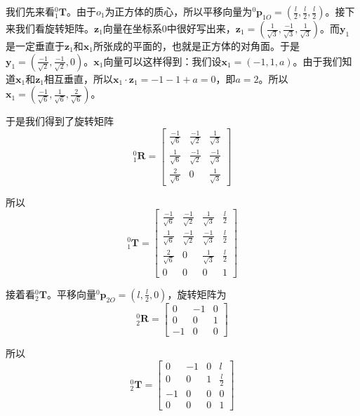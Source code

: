 \documentclass{homework}
\begin{document}
\question 

\begin{sol}

  我们先来看$ _1^0\mathbf{T} $。由于$ o_1 $为正方体的质心，所以平移向量为$ ^0\mathbf{p}_{1O} = (\frac{l}{2}, \frac{l}{2}, \frac{l}{2}) $。接下来我们看旋转矩阵。$ \mathbf{z}_1 $向量在坐标系0中很好写出来，$ \mathbf{z}_1 = (\frac{1}{\sqrt{3}}, \frac{-1}{\sqrt{3}}, \frac{1}{\sqrt{3}}) $。而$ \mathbf{y}_1 $是一定垂直于$ \mathbf{z}_1 $和$ \mathbf{x}_1 $所张成的平面的，也就是正方体的对角面。于是$ \mathbf{y}_1 = (\frac{-1}{\sqrt{2}}, \frac{-1}{\sqrt{2}}, 0) $。$ \mathbf{x}_1 $向量可以这样得到：我们设$ \mathbf{x}_1 = (-1, 1, a) $。由于我们知道$ \mathbf{x}_1 $和$ \mathbf{z}_1 $相互垂直，所以$ \mathbf{x}_1 \cdot \mathbf{z}_1 = - 1 - 1 + a = 0 $，即$ a = 2 $。所以$ \mathbf{x}_1 = (\frac{-1}{\sqrt{6}}, \frac{1}{\sqrt{6}}, \frac{2}{\sqrt{6}}) $。

  于是我们得到了旋转矩阵
  \[
    _1^0\mathbf{R} = 
    \begin{bmatrix}
      \frac{-1}{\sqrt{6}} & \frac{-1}{\sqrt{2}} & \frac{1}{\sqrt{3}} \\
      \frac{1}{\sqrt{6}} & \frac{-1}{\sqrt{2}} & \frac{-1}{\sqrt{3}} \\
      \frac{2}{\sqrt{6}} & 0 & \frac{1}{\sqrt{3}}
    \end{bmatrix}
  \]

  所以
  \[
    _1^0\mathbf{T} = 
    \begin{bmatrix}
      \frac{-1}{\sqrt{6}} & \frac{-1}{\sqrt{2}} & \frac{1}{\sqrt{3}} & \frac{l}{2} \\
      \frac{1}{\sqrt{6}} & \frac{-1}{\sqrt{2}} & \frac{-1}{\sqrt{3}} & \frac{l}{2} \\
      \frac{2}{\sqrt{6}} & 0 & \frac{1}{\sqrt{3}} & \frac{l}{2} \\
      0 & 0 & 0 & 1
    \end{bmatrix}
  \]

  接着看$ _2^0\mathbf{T} $。平移向量$ ^0\mathbf{p}_{2O} = (l, \frac{l}{2}, 0) $，旋转矩阵为
  \[
    _2^0\mathbf{R} = 
    \begin{bmatrix}
      0 & -1 & 0 \\
      0 & 0 & 1 \\
      -1 & 0 & 0 
    \end{bmatrix}
  \]

  所以
  \[
    _2^0\mathbf{T} = 
    \begin{bmatrix}
      0 & -1 & 0 & l \\
      0 & 0 & 1 & \frac{l}{2} \\
      -1 & 0 & 0 & 0 \\
      0 & 0 & 0 & 1
    \end{bmatrix}
  \]


\end{sol}
\end{document}
